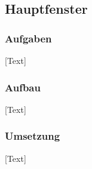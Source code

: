 
\subsection{Hauptfenster}

\subsubsection{Aufgaben}
[Text]

\subsubsection{Aufbau}
[Text]

\subsubsection{Umsetzung}
[Text]


